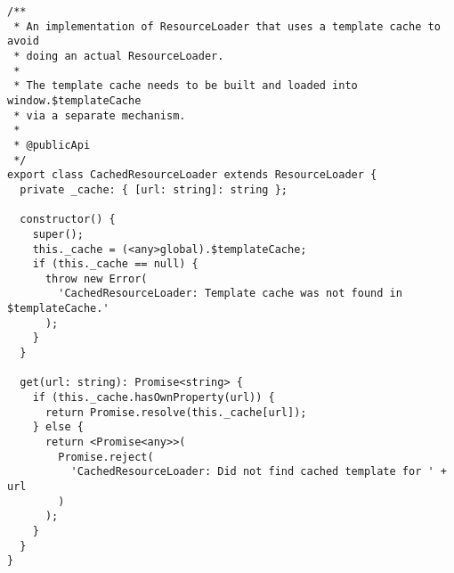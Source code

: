 \begin{verbatim}
/**
 * An implementation of ResourceLoader that uses a template cache to avoid
 * doing an actual ResourceLoader.
 *
 * The template cache needs to be built and loaded into window.$templateCache
 * via a separate mechanism.
 *
 * @publicApi
 */
export class CachedResourceLoader extends ResourceLoader {
  private _cache: { [url: string]: string };

  constructor() {
    super();
    this._cache = (<any>global).$templateCache;
    if (this._cache == null) {
      throw new Error(
        'CachedResourceLoader: Template cache was not found in $templateCache.'
      );
    }
  }

  get(url: string): Promise<string> {
    if (this._cache.hasOwnProperty(url)) {
      return Promise.resolve(this._cache[url]);
    } else {
      return <Promise<any>>(
        Promise.reject(
          'CachedResourceLoader: Did not find cached template for ' + url
        )
      );
    }
  }
}
\end{verbatim}
